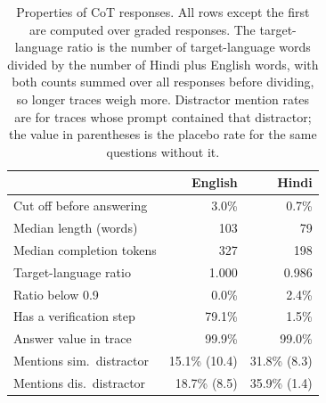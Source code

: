 \begin{table}[t]
\centering
\small
\setlength{\tabcolsep}{4pt}
\begin{tabular}{lrr}
\toprule
 & English & Hindi \\
\midrule
Cut off before answering & 3.0\% & 0.7\% \\
Median length (words) & 103 & 79 \\
Median completion tokens & 327 & 198 \\
Target-language ratio & 1.000 & 0.986 \\
Ratio below 0.9 & 0.0\% & 2.4\% \\
Has a verification step & 79.1\% & 1.5\% \\
Answer value in trace & 99.9\% & 99.0\% \\
Mentions sim.\ distractor & 15.1\% (10.4) & 31.8\% (8.3) \\
Mentions dis.\ distractor & 18.7\% (8.5) & 35.9\% (1.4) \\
\bottomrule
\end{tabular}
\caption{Properties of CoT responses. All rows except the first are computed over graded responses. The target-language ratio is the number of target-language words divided by the number of Hindi plus English words, with both counts summed over all responses before dividing, so longer traces weigh more. Distractor mention rates are for traces whose prompt contained that distractor; the value in parentheses is the placebo rate for the same questions without it.}
\label{tab:trace}
\end{table}
